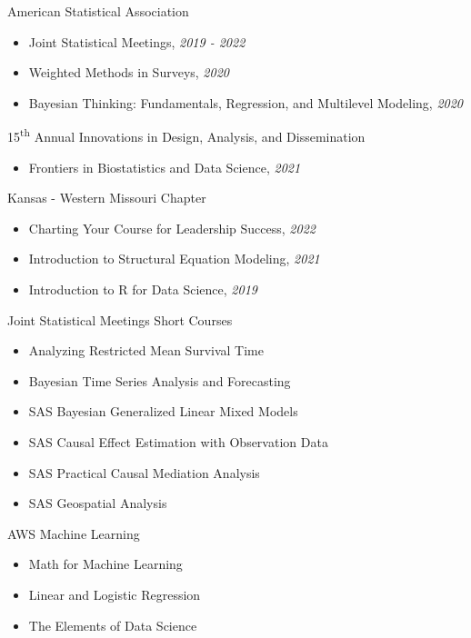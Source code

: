 
\Development
{American Statistical Association}
{\begin{itemize}
    \item Joint Statistical Meetings, \emph{2019 - 2022}
    \item Weighted Methods in Surveys, \emph{2020}
    \item Bayesian Thinking: Fundamentals, Regression, and Multilevel
        Modeling, \emph{2020}
\end{itemize}}

\vspace*{0.01 in}

\Development
{15\textsuperscript{th} Annual Innovations in Design, Analysis, and Dissemination}
{\begin{itemize}
    \item Frontiers in Biostatistics and Data Science, \emph{2021}
\end{itemize}}

\vspace*{0.01 in}

\Development
{Kansas - Western Missouri Chapter}
{\begin{itemize}
     \item Charting Your Course for Leadership Success, \emph{2022}
     \item Introduction to Structural Equation Modeling, \emph{2021}
     \item Introduction to R for Data Science, \emph{2019}
\end{itemize}}

\vspace*{0.01 in}

\Development
{Joint Statistical Meetings Short Courses}
{\begin{itemize}
    \item Analyzing Restricted Mean Survival Time
    \item Bayesian Time Series Analysis and Forecasting
    \item SAS Bayesian Generalized Linear Mixed Models
    \item SAS Causal Effect Estimation with Observation Data
    \item SAS Practical Causal Mediation Analysis
    \item SAS Geospatial Analysis
\end{itemize}}

\vspace*{0.01 in}

\Development
{AWS Machine Learning}
{\begin{itemize}
    \item Math for Machine Learning
    \item Linear and Logistic Regression
    \item The Elements of Data Science
\end{itemize}}




